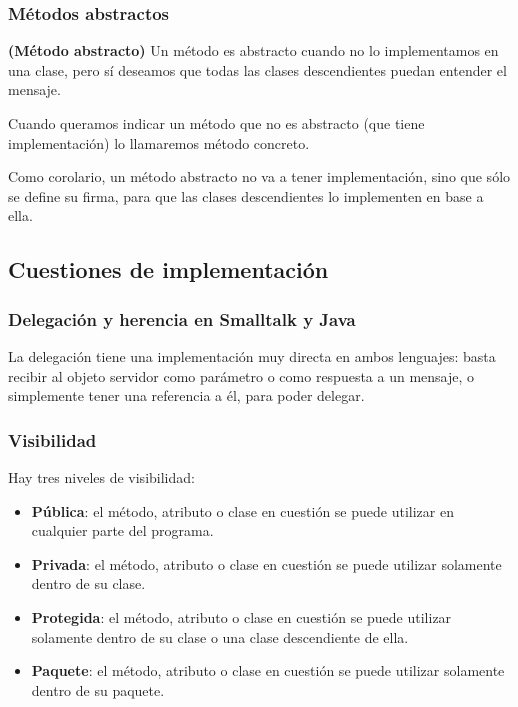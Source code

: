 \documentclass[../main.tex]{subfiles}
\begin{document}
        \subsubsection{Métodos abstractos}
            \begin{definition} \textbf{(Método abstracto)}
                Un método es abstracto cuando no lo implementamos en una clase, pero sí deseamos que todas las clases descendientes puedan entender el mensaje.
                
                Cuando queramos indicar un método que no es abstracto (que tiene implementación) lo llamaremos método concreto.
            \end{definition}

            Como corolario, un método abstracto no va a tener implementación, sino que sólo se define su firma, para que las clases descendientes lo implementen en base a ella.

    \subsection{Cuestiones de implementación}
        \subsubsection{Delegación y herencia en Smalltalk y Java}
            La delegación tiene una implementación muy directa en ambos lenguajes: basta recibir al objeto servidor como parámetro o como respuesta a un mensaje, o simplemente tener una referencia a él, para poder delegar.

        \subsubsection{Visibilidad}
            Hay tres niveles de visibilidad:
            \begin{itemize}
                \item \textbf{Pública}: 
                    el método, atributo o clase en cuestión se puede utilizar en cualquier parte del
                programa.
                \item \textbf{Privada}: 
                    el método, atributo o clase en cuestión se puede utilizar solamente dentro de su
                clase.
                \item \textbf{Protegida}: 
                    el método, atributo o clase en cuestión se puede utilizar solamente dentro de su clase o una clase descendiente de ella.
                \item \textbf{Paquete}: 
                    el método, atributo o clase en cuestión se puede utilizar solamente dentro de su paquete.
            \end{itemize}
\end{document}
